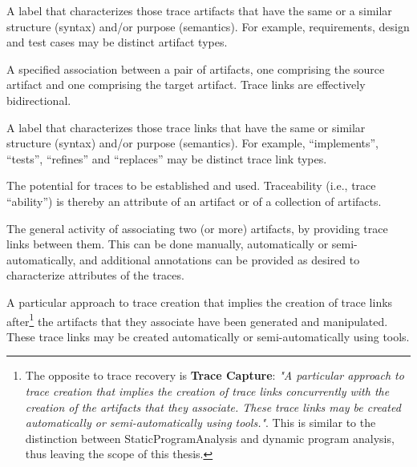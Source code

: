 \begin{definition}
A label that characterizes those trace artifacts that have the same or a similar structure (syntax) and/or purpose (semantics).
For example, requirements, design and test cases may be distinct artifact types.
\cite{DBLP:books/daglib/p/GotelCHZEGDAMM12}
\end{definition}

\begin{definition}
A specified association between a pair of artifacts, one comprising the source artifact and one comprising the target artifact. 
Trace links are effectively bidirectional. 
\cite{DBLP:books/daglib/p/GotelCHZEGDAMM12} 
\end{definition}

\begin{definition}
A label that characterizes those trace links that have the
same or similar structure (syntax) and/or purpose (semantics). 
For example, “implements”, “tests”, “refines” and “replaces” may be distinct trace link types. 
\cite{DBLP:books/daglib/p/GotelCHZEGDAMM12} 
\end{definition}

\begin{definition}[Traceability]
The potential for traces to be established and used.
Traceability (i.e., trace “ability”) is thereby an attribute of an artifact or of a collection of artifacts.
\cite{DBLP:books/daglib/p/GotelCHZEGDAMM12} 
\end{definition}

\begin{definition}
The general activity of associating two (or more) artifacts, by providing trace links between them. 
This can be done manually, automatically or semi-automatically, and additional annotations can be provided as desired to characterize attributes of the traces.
\cite{DBLP:books/daglib/p/GotelCHZEGDAMM12}
\end{definition}

\begin{definition}
A particular approach to trace creation that implies the creation of trace links after\footnote{The opposite to trace recovery is \textbf{Trace Capture}: \textit{"A particular approach to trace creation that implies the creation of trace links concurrently with the creation of the artifacts that they associate. These trace links may be created automatically or semi-automatically using tools."}\cite{DBLP:books/daglib/p/GotelCHZEGDAMM12}. This is similar to the distinction between \gls{StaticProgramAnalysis} and dynamic program analysis, thus leaving the scope of this thesis.} the artifacts that they associate have been generated and manipulated.
These trace links may be created automatically or semi-automatically using tools. 
\cite{DBLP:books/daglib/p/GotelCHZEGDAMM12}
\end{definition}


